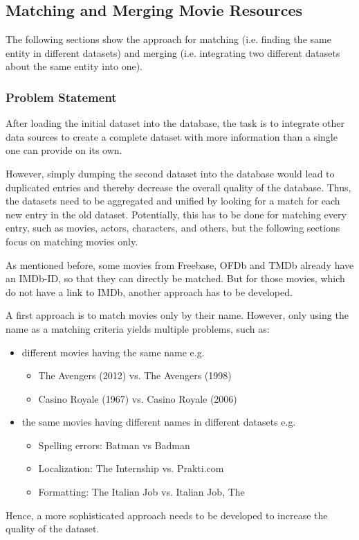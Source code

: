 \subsection{Matching and Merging Movie Resources}
\label{subsec_method_matching}

The following sections show the approach for matching (i.e. finding the same entity in different datasets)
and merging (i.e. integrating two different datasets about the same entity into one).

\subsubsection{Problem Statement}
After loading the initial dataset into the database, the task is to integrate other data sources to create a complete dataset with more information than a single one can provide on its own.

However, simply dumping the second dataset into the database would lead to duplicated entries and thereby decrease the overall quality of the database.
Thus, the datasets need to be aggregated and unified by looking for a match for each new entry in the old dataset.
Potentially, this has to be done for matching every entry, such as movies, actors, characters, and others, but the following sections focus on matching movies only.

As mentioned before, some movies from Freebase, OFDb and TMDb already have an IMDb-ID, so that they can directly be matched.
But for those movies, which do not have a link to IMDb, another approach has to be developed.

A first approach is to match movies only by their name.
However, only using the name as a matching criteria yields multiple problems, such as:
\begin{itemize}
	\item different movies having the same name e.g.
	\begin{itemize}
        \item The Avengers (2012) vs. The Avengers (1998)
        \item Casino Royale (1967) vs. Casino Royale (2006)
    \end{itemize}
	\item the same movies having different names in different datasets e.g.
	\begin{itemize}
        \item Spelling errors: Batman vs Badman
        \item Localization: The Internship vs. Prakti.com
        \item Formatting: The Italian Job vs. Italian Job, The
     \end{itemize}
\end{itemize}
Hence, a more sophisticated approach needs to be developed to increase the quality of the dataset.

